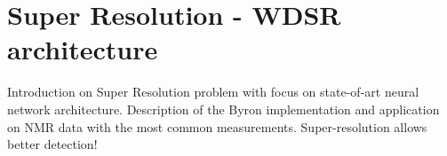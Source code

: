 \documentclass{standalone}
\begin{document}
\section[WDSR]{Super Resolution - WDSR architecture}\label{sr}

Introduction on Super Resolution problem with focus on state-of-art neural network architecture.
Description of the Byron implementation and application on NMR data with the most common measurements.
Super-resolution allows better detection!
\end{document}
